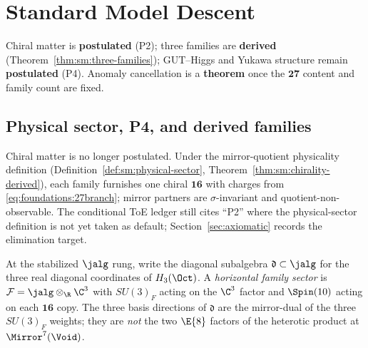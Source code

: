 \section{Standard Model Descent}
\label{sec:sm}

Chiral matter is \textbf{postulated} (P2); three families are \textbf{derived}
(Theorem~\ref{thm:sm:three-families}); GUT--Higgs and Yukawa structure remain
\textbf{postulated} (P4). Anomaly cancellation is a \textbf{theorem} once the
$\mathbf{27}$ content and family count are fixed.

\subsection{Physical sector, P4, and derived families}
\label{sec:sm:postulates}

\begin{remark}
\label{post:sm:P2}
Chiral matter is no longer postulated. Under the mirror-quotient physicality
definition (Definition~\ref{def:sm:physical-sector},
Theorem~\ref{thm:sm:chirality-derived}), each family furnishes one chiral
$\mathbf{16}$ with charges from \eqref{eq:foundations:27branch}; mirror
partners are $\sigma$-invariant and quotient-non-observable. The conditional
ToE ledger still cites ``P2'' where the physical-sector definition is not yet
taken as default; Section~\ref{sec:axiomatic} records the elimination target.
\end{remark}


\begin{definition}\label{def:sm:horizontal}
At the stabilized $\jalg$ rung, write the diagonal subalgebra
$\mathfrak{d}\subset\jalg$ for the three real diagonal coordinates of
$H_3(\Oct)$. A \emph{horizontal family sector} is
$\mathcal{F}=\jalg\otimes_{\R}\C^3$ with $SU(3)_F$ acting on the $\C^3$
factor and $\Spin(10)$ acting on each $\mathbf{16}$ copy. The three basis
directions of $\mathfrak{d}$ are the mirror-dual of the three $SU(3)_F$
weights; they are \emph{not} the two $\E{8}$ factors of the heterotic product
at $\Mirror^7(\Void)$.
\end{definition}

